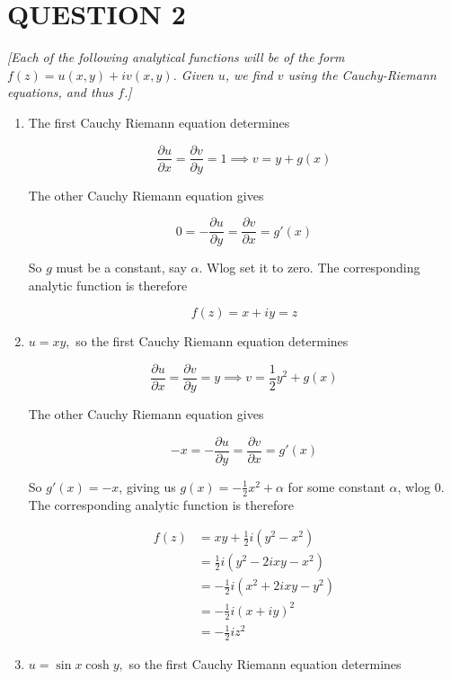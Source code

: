 \documentclass[a4paper]{article}
\begin{document}
\section{QUESTION 2}
\emph{[Each of the following analytical functions will be of the form $ f(z) = u(x,y) + iv(x,y) $. Given $ u $, we find $ v $ using the Cauchy-Riemann equations, and thus $ f $.] }
\begin{enumerate}
	
	\item The first Cauchy Riemann equation determines
	
	\[ \frac{\partial u }{\partial x} = \frac{\partial v }{\partial y} = 1 \implies v = y + g(x) \]
	
	The other Cauchy Riemann equation gives
	
	\[ 0 = - \frac{\partial u }{\partial y} = \frac{\partial v }{\partial x} = g'(x) \]
	
	So $ g $ must be a constant, say $ \alpha $. Wlog set it to zero. The corresponding analytic function is therefore
	
	\[ f(z) = x + iy   = z  \]
	
	\item $ u = xy, $ so the first Cauchy Riemann equation determines
	
	\[ \frac{\partial u }{\partial x} = \frac{\partial v }{\partial y} = y \implies  v = \frac{1}{2} y^{2} + g(x) \]
	
	The other Cauchy Riemann equation gives
	
	\[ -x = - \frac{\partial u }{\partial y} = \frac{\partial v }{\partial x} = g'(x) \]
	
	So $ g'(x) = - x $, giving us $ g(x) = - \frac{1}{2} x^{2} + \alpha $ for some constant $ \alpha $, wlog 0. The corresponding analytic function is therefore
	
	\begin{align*}
	f(z) & = xy +  \frac{1}{2} i (y^{2} - x^{2}) \\
	& = \frac{1}{2} i \left( y^{2} - 2ixy - x^{2}    \right) \\
	& =  - \frac{1}{2} i \left( x^{2} + 2 i x y - y^{2}    \right) \\
	& = - \frac{1}{2} i \left( x + i y   \right)^{2} \\
	& = - \frac{1}{2} i z^{2}
	\end{align*}
	
	
		
	\item $ u = \sin x \cosh y, $ so the first Cauchy Riemann equation determines
	

\end{enumerate}
\end{document}
